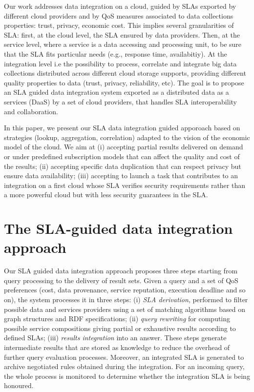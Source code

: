 \documentclass[10pt, conference, compsocconf]{IEEEtran}
\begin{document}
Our work  addresses data integration on a  cloud, guided by  SLAs exported by different cloud providers and by QoS measures associated to data collections properties: trust, privacy, economic cost. 
This implies several granularities of SLA: first, at the cloud level, the SLA ensured by data providers. Then, at the service level, where a service is a  data accessing and processing unit, to be sure that the SLA fits particular  needs (e.g., response time, availabitiy). At the integration level i.e the possibility to process, correlate and integrate big data collections distributed across different cloud storage supports, providing different quality properties to data (trust, privacy, reliability, etc).
The goal is to propose an SLA guided data integration system exported as a distributed data as a services (DaaS) by a set of cloud providers, that handles  SLA interoperability and collaboration. 


In this paper, we present our SLA data integration guided apporoach based on
 strategies (lookup, aggregation, correlation) adapted to the vision of the economic model of the cloud.
We aim at (i) accepting partial results delivered on demand or under predefined subscription models that can affect the quality and cost of the results; (ii) accepting specific data duplication that can respect privacy but ensure data availability; (iii) accepting to launch a task that contributes to an integration on a first cloud whose SLA verifies security requirements rather than a more powerful cloud but with less security guarantees in the SLA. 

\section{The SLA-guided  data integration approach}
Our SLA guided data  integration approach proposes three steps starting from  query processing   to the delivery of  result sets.
Given a query and a set of QoS preferences (cost, data provenance, service reputation, execution deadline and so on), the system processes it in three steps:  (i)  {\em SLA derivation}, performed to filter possible data and services providers using a set of matching algorithms based on  graph structures and RDF specifications;
(ii)  {\em query rewriting} for computing possible service compositions giving partial or exhaustive  results according to defined SLAs; (iii)  {\em results  integration} into an answer. 
These steps generate intermediate results that are stored as knowledge  to reduce the overhead of further query evaluation processes. Moreover, an integrated SLA is generated to archive  negotiated rules obtained during  the integration. For an incoming query, the whole process is monitored to determine whether the integration SLA is being honoured.
\end{document}
